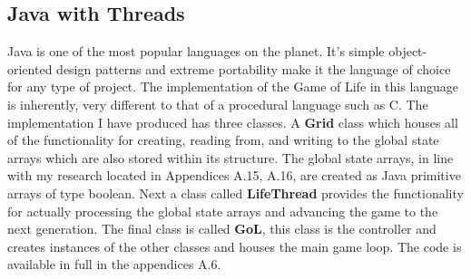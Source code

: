 \documentclass[11pt]{article} %
\begin{document}
\subsection{Java with Threads}
Java is one of the most popular languages on the planet. It's simple object-oriented design patterns and extreme portability make it the language of choice for any type of project. The implementation of the Game of Life in this language is inherently, very different to that of a procedural language such as C. The implementation I have produced has three classes. A {\bf Grid} class which houses all of the functionality for creating, reading from, and writing to the global state arrays which are also stored within its structure. The global state arrays, in line with my research located in Appendices A.15, A.16, are created as Java primitive arrays of type boolean. Next a class called {\bf LifeThread} provides the functionality for actually processing the global state arrays and advancing the game to the next generation. The final class is called {\bf GoL}, this class is the controller and creates instances of the other classes and houses the main game loop. The code is available in full in the appendices A.6.
\end{document}
